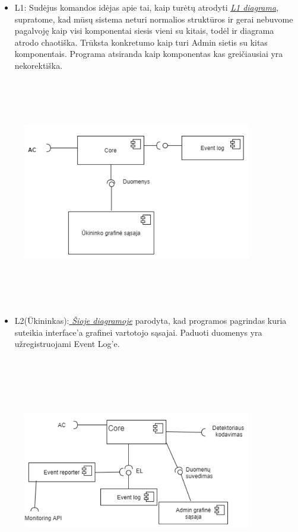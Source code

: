 \documentclass[oneside]{VUMIFPSkursinis}
\begin{document}
\begin{itemize}
	\item L1: Sudėjus komandos idėjas apie tai, kaip turėtų atrodyti \hyperref[fig:l1]{\textit{ L1 diagrama}}, supratome, kad mūsų sistema neturi normalios struktūros ir gerai nebuvome pagalvoję kaip visi komponentai siesis vieni su kitais, todėl ir diagrama atrodo chaotiška. Trūksta konkretumo kaip turi Admin sietis su kitas komponentais. Programa atsiranda kaip komponentas  kas greičiausiai yra nekorektiška.

\end{itemize}
\begin{figure}[H]
\centering	
\includegraphics[width=10cm,height=10cm,keepaspectratio]{l2uki.png}
\caption{}
\label{fig:l2uki}
\end{figure}
	

	\begin{itemize}
		\item L2(Ūkininkas):\hyperref[fig:l2uki]{\textit{  Šioje diagramoje}} parodyta, kad programos pagrindas kuria suteikia interface’a grafinei vartotojo sąsajai. Paduoti duomenys yra užregistruojami Event Log’e.

	\end{itemize}
	\begin{figure}[H]
	\centering	
\includegraphics[width=10cm,height=10cm,keepaspectratio]{l2admin.png}
\caption{}
\label{fig:l2admin}
\end{figure}
	
\end{document}
